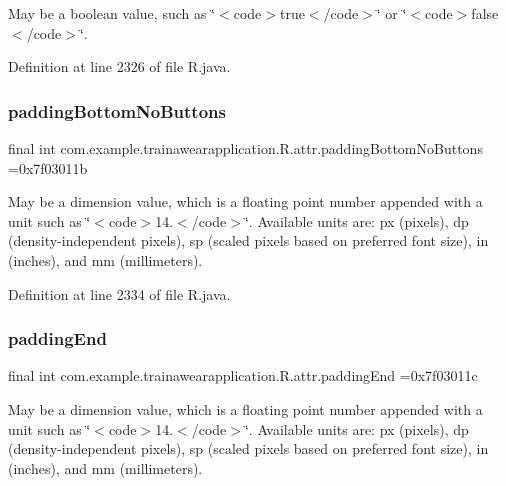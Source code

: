 May be a boolean value, such as \char`\"{}$<$code$>$true$<$/code$>$\char`\"{} or \char`\"{}$<$code$>$false$<$/code$>$\char`\"{}. 

Definition at line 2326 of file R.\+java.

\mbox{\label{classcom_1_1example_1_1trainawearapplication_1_1_r_1_1attr_ad9b7c941d36f337f71d8ab32b84b07c6}} 
\subsubsection{\texorpdfstring{paddingBottomNoButtons}{paddingBottomNoButtons}}
{\footnotesize\ttfamily final int com.\+example.\+trainawearapplication.\+R.\+attr.\+padding\+Bottom\+No\+Buttons =0x7f03011b\hspace{0.3cm}{\ttfamily [static]}}

May be a dimension value, which is a floating point number appended with a unit such as \char`\"{}$<$code$>$14.\+5sp$<$/code$>$\char`\"{}. Available units are\+: px (pixels), dp (density-\/independent pixels), sp (scaled pixels based on preferred font size), in (inches), and mm (millimeters). 

Definition at line 2334 of file R.\+java.

\mbox{\label{classcom_1_1example_1_1trainawearapplication_1_1_r_1_1attr_a489d6d66db2bc9add2631811bda8f237}} 
\subsubsection{\texorpdfstring{paddingEnd}{paddingEnd}}
{\footnotesize\ttfamily final int com.\+example.\+trainawearapplication.\+R.\+attr.\+padding\+End =0x7f03011c\hspace{0.3cm}{\ttfamily [static]}}

May be a dimension value, which is a floating point number appended with a unit such as \char`\"{}$<$code$>$14.\+5sp$<$/code$>$\char`\"{}. Available units are\+: px (pixels), dp (density-\/independent pixels), sp (scaled pixels based on preferred font size), in (inches), and mm (millimeters). 

